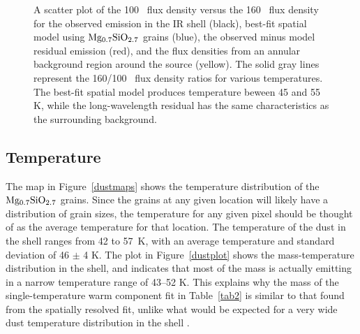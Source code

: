 \documentclass{emulateapj}
\begin{document}
\begin{figure}
\center
{} 
\caption{\label{colorplot}A scatter plot of the 100 \micron\ flux density versus the 160 \micron\ flux density for the observed emission in the IR shell (black), best-fit spatial model using $\rm Mg_{0.7}SiO_{2.7}$ grains (blue), the observed minus model residual emission (red), and the flux densities from an annular background region around the source (yellow). The solid gray lines represent the 160/100 \micron\ flux density ratios for various temperatures. The best-fit spatial model produces temperature beween 45 and 55 K, while the long-wavelength residual has the same characteristics as the surrounding background.}
\end{figure}




\subsection{Temperature}\label{temp}

The map in Figure~\ref{dustmaps} shows the temperature distribution of the $\rm Mg_{0.7}SiO_{2.7}$ grains. Since the grains at any given location will likely have a distribution of grain sizes, the temperature for any given pixel should be thought of as the average temperature for that location. The temperature of the dust in the shell ranges from 42 to 57~K, with an average temperature and standard deviation of 46 $\pm$ 4 K. The plot in Figure~\ref{dustplot} shows the mass-temperature distribution in the shell, and indicates that most of the mass is actually emitting in a narrow temperature range of 43--52 K. This explains why the mass of the single-temperature warm component fit in Table~\ref{tab2} is similar to that found from the spatially resolved fit, unlike what would be expected for a very wide dust temperature distribution in the shell \citep{temim13}. 
\end{document}
